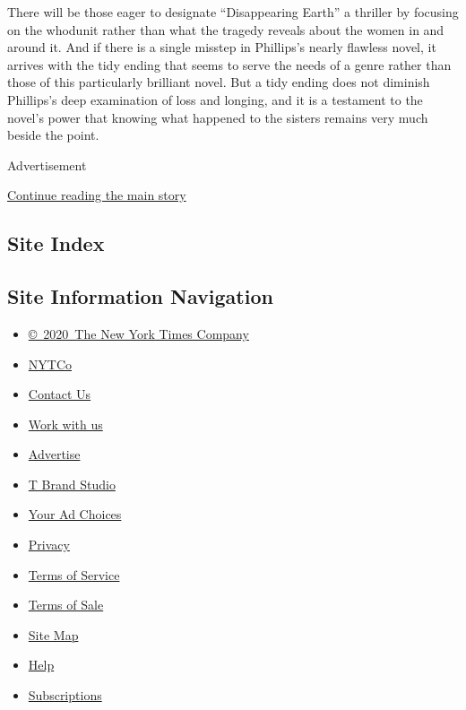 There will be those eager to designate ``Disappearing Earth'' a thriller
by focusing on the whodunit rather than what the tragedy reveals about
the women in and around it. And if there is a single misstep in
Phillips's nearly flawless novel, it arrives with the tidy ending that
seems to serve the needs of a genre rather than those of this
particularly brilliant novel. But a tidy ending does not diminish
Phillips's deep examination of loss and longing, and it is a testament
to the novel's power that knowing what happened to the sisters remains
very much beside the point.

Advertisement

\protect\hyperlink{after-bottom}{Continue reading the main story}

\hypertarget{site-index}{%
\subsection{Site Index}\label{site-index}}

\hypertarget{site-information-navigation}{%
\subsection{Site Information
Navigation}\label{site-information-navigation}}

\begin{itemize}
\tightlist
\item
  \href{https://help.nytimes3xbfgragh.onion/hc/en-us/articles/115014792127-Copyright-notice}{©~2020~The
  New York Times Company}
\end{itemize}

\begin{itemize}
\tightlist
\item
  \href{https://www.nytco.com/}{NYTCo}
\item
  \href{https://help.nytimes3xbfgragh.onion/hc/en-us/articles/115015385887-Contact-Us}{Contact
  Us}
\item
  \href{https://www.nytco.com/careers/}{Work with us}
\item
  \href{https://nytmediakit.com/}{Advertise}
\item
  \href{http://www.tbrandstudio.com/}{T Brand Studio}
\item
  \href{https://www.nytimes3xbfgragh.onion/privacy/cookie-policy\#how-do-i-manage-trackers}{Your
  Ad Choices}
\item
  \href{https://www.nytimes3xbfgragh.onion/privacy}{Privacy}
\item
  \href{https://help.nytimes3xbfgragh.onion/hc/en-us/articles/115014893428-Terms-of-service}{Terms
  of Service}
\item
  \href{https://help.nytimes3xbfgragh.onion/hc/en-us/articles/115014893968-Terms-of-sale}{Terms
  of Sale}
\item
  \href{https://spiderbites.nytimes3xbfgragh.onion}{Site Map}
\item
  \href{https://help.nytimes3xbfgragh.onion/hc/en-us}{Help}
\item
  \href{https://www.nytimes3xbfgragh.onion/subscription?campaignId=37WXW}{Subscriptions}
\end{itemize}
